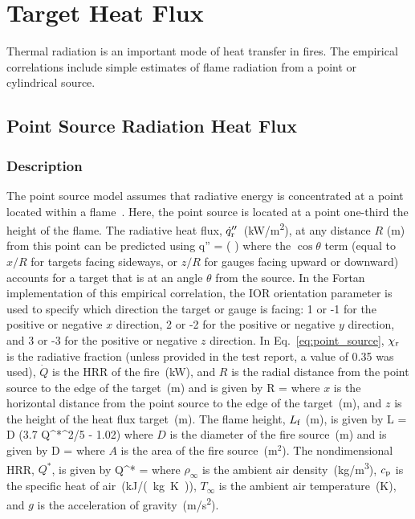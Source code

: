 
\chapter{Target Heat Flux}
\label{Target_Heat_Flux_Chapter}

Thermal radiation is an important mode of heat transfer in fires. The empirical correlations include simple estimates of flame radiation from a point or cylindrical source.

\section{Point Source Radiation Heat Flux}
\label{sec:Point_Source_Radiation}

\subsection*{Description}

The point source model assumes that radiative energy is concentrated at a point located within a flame~\cite{Beyler2:SFPE}.
Here, the point source is located at a point one-third the height of the flame.
The radiative heat flux, $\dot q''\sb{r}$~(\si{kW/m^2}), at any distance $R$ (\si{m}) from this point can be predicted using
\be
\dot q'' = \cos\theta \left(  \right)
\label{eq:point_source}
\ee
where the $\cos\theta$ term (equal to $x/R$ for targets facing sideways, or $z/R$ for gauges facing upward or downward) accounts for a target that is at an angle $\theta$ from the source. In the Fortan implementation of this empirical correlation, the IOR orientation parameter is used to specify which direction the target or gauge is facing: 1 or -1 for the positive or negative $x$ direction, 2 or -2 for the positive or negative $y$ direction, and 3 or -3 for the positive or negative $z$ direction. In Eq.~\ref{eq:point_source}, $\chi\sb{r}$ is the radiative fraction (unless provided in the test report, a value of 0.35 was used), $\dot Q$ is the HRR of the fire~(\si{kW}), and $R$ is the radial distance from the point source to the edge of the target~(\si{m}) and is given by
\be
R = 
\label{eq:point_source_R}
\ee
where $x$ is the horizontal distance from the point source to the edge of the target~(\si{m}), and $z$ is the height of the heat flux target~(\si{m}). The flame height, $L\sb{f}$ (\si{m}), is given by
\be
L = D (3.7 Q^{*^{2/5}} - 1.02)
\label{eq:point_source_Lf}
\ee
where $D$ is the diameter of the fire source~(\si{m}) and is given by
\be
D = 
\label{eq:point_source_D}
\ee
where $A$ is the area of the fire source~(m$^2$). The nondimensional HRR, $Q^*$, is given by
\be
Q^* = 
\label{eq:point_source_Qstar}
\ee
where $\rho_\infty$ is the ambient air density~(\si{kg/m^3}), $c\sb{p}$ is the specific heat of air~(\si{kJ/(kg.K)}), $T_\infty$ is the ambient air temperature~(\si{K}), and $g$ is the acceleration of gravity~(\si{m/s^2}).

